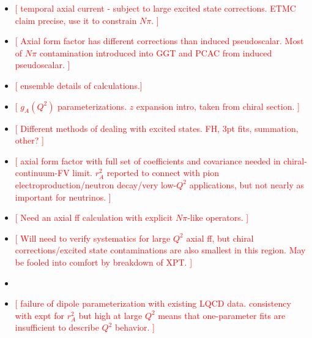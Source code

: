 \begin{itemize}
\item
\textcolor{red}{[
 temporal axial current - subject to large excited state corrections.
 ETMC claim precise, use it to constrain $N\pi$.
]}
\item
\textcolor{red}{[
 Axial form factor has different corrections than induced pseudoscalar.
 Most of $N\pi$ contamination introduced into GGT and PCAC from induced pseudoscalar.
]}
\item
\textcolor{red}{[ ensemble details of calculations.]}
\item
\textcolor{red}{[
 $g_A(Q^2)$ parameterizations.
 $z$ expansion intro, taken from chiral section.
]}
\item
\textcolor{red}{[
 Different methods of dealing with excited states.
 FH, 3pt fits, summation, other?
]}
\item
\textcolor{red}{[
 axial form factor with full set of coefficients and covariance needed
 in chiral-continuum-FV limit.
 $r_A^2$ reported to connect with pion electroproduction/neutron decay/very low-$Q^2$ applications,
 but not nearly as important for neutrinos.
]}
\item
\textcolor{red}{[ Need an axial ff calculation with explicit $N\pi$-like operators. ]}
\item
\textcolor{red}{[ Will need to verify systematics for large $Q^2$ axial ff,
 but chiral corrections/excited state contaminations are also smallest in this region.
 May be fooled into comfort by breakdown of XPT.
]}
\item
\item
\textcolor{red}{[
 failure of dipole parameterization with existing LQCD data.
 consistency with expt for $r_A^2$ but high at large $Q^2$ means
 that one-parameter fits are insufficient to describe $Q^2$ behavior.
 ]}
\end{itemize}

